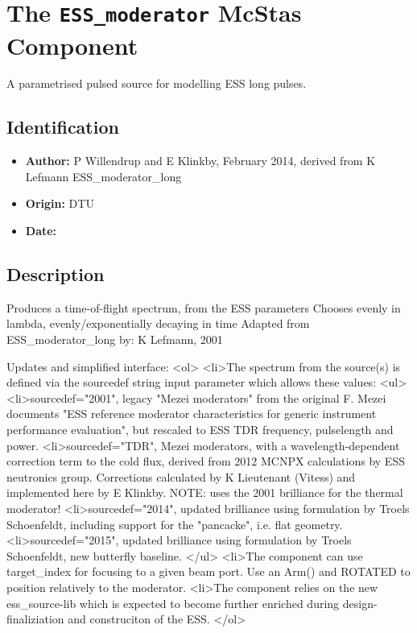 \section{The \texttt{ESS\_moderator} McStas Component}
A parametrised pulsed source for modelling ESS long pulses.

\subsection*{Identification}
\begin{itemize}
  \item \textbf{Author:} P Willendrup and E Klinkby, February 2014, derived from K Lefmann ESS\_moderator\_long
  \item \textbf{Origin:} DTU
  \item \textbf{Date:} 
\end{itemize}

\subsection*{Description}
Produces a time-of-flight spectrum, from the ESS parameters Chooses evenly in lambda, evenly/exponentially decaying in time Adapted from ESS\_moderator\_long by: K Lefmann, 2001

Updates and simplified interface: \textless{}ol\textgreater{} \textless{}li\textgreater{}The spectrum from the source(s) is defined via the sourcedef string input parameter which allows these values: \textless{}ul\textgreater{} \textless{}li\textgreater{}sourcedef="2001", legacy "Mezei moderators" from the original F. Mezei documents "ESS reference moderator characteristics for generic instrument performance evaluation", but rescaled to ESS TDR frequency, pulselength and power. \textless{}li\textgreater{}sourcedef="TDR", Mezei moderators, with a wavelength-dependent correction term to the cold flux, derived from 2012 MCNPX calculations by ESS neutronics group. Corrections calculated by K Lieutenant (Vitess) and implemented here by E Klinkby. NOTE: uses the 2001 brilliance for the thermal moderator! \textless{}li\textgreater{}sourcedef="2014", updated brilliance using formulation by Troels Schoenfeldt, including support for the "pancacke", i.e. flat geometry. \textless{}li\textgreater{}sourcedef="2015", updated brilliance using formulation by Troels Schoenfeldt, new butterfly baseline. \textless{}/ul\textgreater{} \textless{}li\textgreater{}The component can use target\_index for focusing to a given beam port. Use an Arm() and ROTATED to position relatively to the moderator. \textless{}li\textgreater{}The component relies on the new ess\_source-lib which is expected to become further enriched during design-finaliziation and construciton of the ESS. \textless{}/ol\textgreater{}

